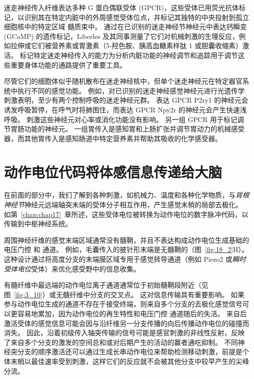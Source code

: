 迷走神经传入纤维表达多种 G 蛋白偶联受体 (GPCR)，这些受体已用荧光抗体标记，以识别其在特定内脏中的外周感觉受体位点，并标记其独特的中央投射到孤立细胞核中的特定区域 髓质束中。
通过在已识别的迷走神经节神经元中表达钙瞬变 (GCaMP) 的遗传标记，Liberles 及其同事测量了它们对机械刺激的生理反应，例如拉伸或它们被营养素或胃激素（5-羟色胺、胰高血糖素样肽 1 或胆囊收缩素）激活。
标记特定迷走神经传入的能力为分析内脏功能的神经调节和追踪用于调节这些重要身体功能的通路提供了重要工具。


尽管它们的细胞体似乎随机散布在迷走神经核中，但单个迷走神经元在特定器官系统中执行不同的感觉功能。
例如，对已识别的迷走神经感觉神经元进行光遗传学刺激表明，至少有两个控制呼吸的迷走神经元群。
表达 GPCR P2ry1 的神经元会诱发呼吸暂停，在呼气时将肺困住，而表达 GPCR Npy2r 的神经元会产生快速浅呼吸。
刺激这些神经元对心率或消化功能没有影响。
另一组 GPCR 用于标记调节胃肠功能的神经元。
一组胃传入是感知胃和上肠扩张并调节胃动力的机械感受器，而其他胃传入是感知肠道中特定营养素并帮助其吸收的化学感受器。



\section{动作电位代码将体感信息传递给大脑}

在前面的部分中，我们了解到各种刺激，如机械力、温度和各种化学物质，与\textit{背根神经节}神经元远端轴突末端的受体分子相互作用，产生感觉末梢的局部去极化。
如第~\ref{chap:chap17}~章所述，这些受体电位被转换为动作电位的数字脉冲代码，以传输到中枢神经系统。


周围神经纤维的感觉末端区域通常没有髓鞘，并且不表达构成动作电位生成基础的电压门控  和  通道。
例如，毛囊传入的披针形末端是无髓鞘的（图~\ref{fig:18_2}H）。
这种设计通过将高度分支的末端膜区域专用于感觉转导通道（例如 Piezo2 或\textit{瞬时受体电位}受体）来优化感受野中的信息收集。


有髓纤维中最远端的动作电位离子通道通常位于初始髓鞘段附近（见图~\ref{fig:3_10}）或无髓纤维中分支的交叉点。
这对信息传输具有重要影响。
如果参与动作电位生成的通道不存在于接受终端，则来自多个分支的去极化感觉信号可以更容易地累加，因为动作电位的再生特性和电压门控  通道随后的失活。
来自后激活受体的感觉信息可能会因与沿纤维另一分支传播的向后传播动作电位的碰撞而消失。
因此，沿着初级传入轴突传输的信号可能是感官刺激的非线性反射，反映了来自多个分支的激发的空间总和或对后期产生的活动的赢者通吃抑制。
不同神经突分支的顺序激活还可以通过生成长串动作电位来帮助检测移动刺激，前提是个体末梢以最佳速率受到刺激，这样它们的反应就不会被其他分支中较早产生的尖峰分流。


